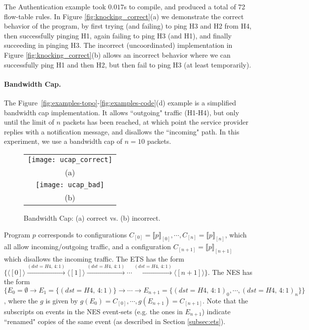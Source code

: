 \documentclass[pldi-cameraready]{sigplanconf}
\begin{document}
The Authentication example took $0.017$s to compile, and produced a total of 72 flow-table rules.
In Figure \ref{fig:knocking_correct}(a) we demonstrate the correct behavior of the
program, by first trying (and failing) to ping H3 and H2 from H4, then successfully
pinging H1, again failing to ping H3 (and H1), and finally succeeding in pinging H3.
The incorrect (uncoordinated) implementation in Figure \ref{fig:knocking_correct}(b) allows an incorrect behavior where
we can successfully ping H1 and then H2, but then fail to ping H3 (at least temporarily).

\paragraph{Bandwidth Cap.}
The Figure~\ref{fig:examples-topo}-\ref{fig:examples-code}(d) example
is a simplified bandwidth cap implementation. It allows ``outgoing"
traffic (H1-H4), but only until the limit of $n$ packets
has been reached,
at which point the service provider replies with a notification message, and
disallows the ``incoming" path.
In this experiment, we use a bandwidth cap of $n=10$ packets.

\begin{figure}[t]
\centering
\bgroup
\def\arraystretch{0.5}
\begin{tabular}{c}
\texttt{[image: ucap\_correct]} \\
{\scriptsize (a)} \\
\texttt{[image: ucap\_bad]} \\
{\scriptsize (b)}
\end{tabular}
\egroup
\caption{Bandwidth Cap: (a) correct vs. (b) incorrect.}
\label{fig:ucap_correct}
\end{figure}

Program $p$ corresponds to configurations
$C_{[0]}{=}\llbracket{p}\rrbracket_{[0]},\allowbreak \cdots,\allowbreak C_{[n]}{=}\llbracket{p}\rrbracket_{[n]}$,
which all allow incoming/outgoing traffic, and a configuration 
$C_{[n+1]}{=}\llbracket{p}\rrbracket_{[n+1]}$ which disallows the incoming traffic.
The ETS has the form $\{\langle [0] \rangle \xrightarrow{(dst{=}H4,\,{4{:}1})} \langle [1] \rangle \xrightarrow{(dst{=}H4,\,{4{:}1})} \cdots \xrightarrow{(dst{=}H4,\,{4{:}1})} \langle [n+1] \rangle\}$.
The NES has the form $\{E_0{=}\emptyset \rightarrow E_1{=}\{(dst{=}H4,\,{4{:}1})\} \rightarrow \cdots
\rightarrow E_{n+1}{=}\{(dst{=}H4,\,{4{:}1})_0,\cdots,(dst{=}H4,\,{4{:}1})_n\} \}$,
where the $g$ is given by $g(E_0)=C_{[0]}, \cdots, g(E_{n+1})=C_{[n+1]}$.
Note that the subscripts on events in the NES event-sets (e.g. the ones in $E_{n+1}$) indicate ``renamed" copies of
the same event (as described in Section \ref{subsec:ets}).
\end{document}
